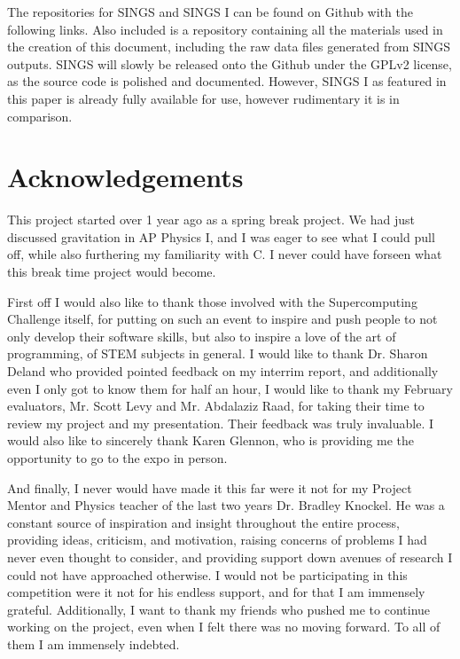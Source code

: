\documentclass[12pt, twoside, letterpaper]{article}
\begin{document}
The repositories for SINGS and SINGS I can be found on Github with the following links. Also included is a repository containing all the materials used in the creation of this document, including the raw data files generated from SINGS outputs. SINGS will slowly be released onto the Github under the GPLv2 license, as the source code is polished and documented. However, SINGS I as featured in this paper is already fully available for use, however rudimentary it is in comparison.
\vspace{0.2cm}

\noindent {}  \href{https://github.com/CodingKraken/SINGS}{} 

\noindent {} \href{https://github.com/CodingKraken/SINGS-I}{}

\noindent {} \href{https://github.com/CodingKraken/SCC-SINGS-Paper}{}

\section*{Acknowledgements} \label{sec:acknowledge}
This project started over 1 year ago as a spring break project. We had just discussed gravitation in AP Physics I, and I was eager to see what I could pull off, while also furthering my familiarity with C. I never could have forseen what this break time project would become.

First off I would also like to thank those involved with the Supercomputing Challenge itself, for putting on such an event to inspire and push people to not only develop their software skills, but also to inspire a love of the art of programming, of STEM subjects in general. I would like to thank Dr. Sharon Deland who provided pointed feedback on my interrim report, and additionally even I only got to know them for half an hour, I would like to thank my February evaluators, Mr. Scott Levy and Mr. Abdalaziz Raad, for taking their time to review my project and my presentation. Their feedback was truly invaluable. I would also like to sincerely thank Karen Glennon, who is providing me the opportunity to go to the expo in person.

And finally, I never would have made it this far were it not for my Project Mentor and Physics teacher of the last two years Dr. Bradley Knockel. He was a constant source of inspiration and insight throughout the entire process, providing ideas, criticism, and motivation, raising concerns of problems I had never even thought to consider, and providing support down avenues of research I could not have approached otherwise. I would not be participating in this competition were it not for his endless support, and for that I am immensely grateful. Additionally, I want to thank my friends who pushed me to continue working on the project, even when I felt there was no moving forward. To all of them I am immensely indebted.

\printbibliography
\end{document}
